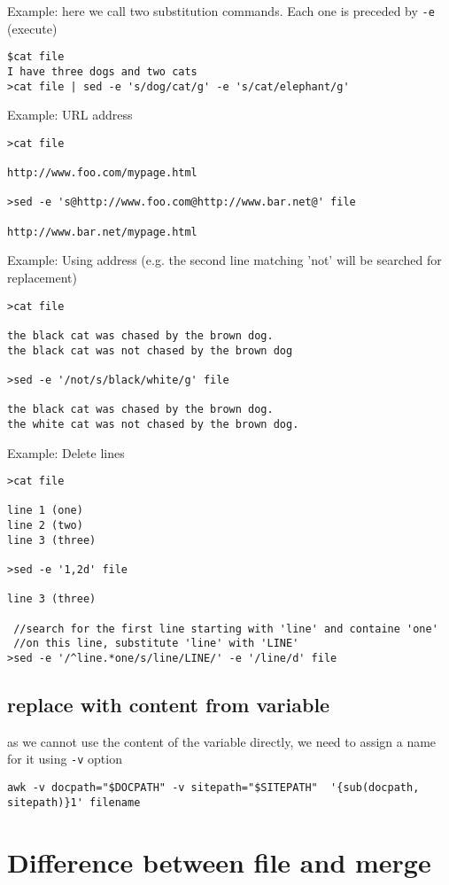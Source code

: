 Example: here we call two substitution commands. Each one is preceded by
\verb!-e! (execute)
\begin{verbatim}
$cat file
I have three dogs and two cats
>cat file | sed -e 's/dog/cat/g' -e 's/cat/elephant/g' 
\end{verbatim}

Example: URL address
\begin{verbatim}
>cat file

http://www.foo.com/mypage.html

>sed -e 's@http://www.foo.com@http://www.bar.net@' file

http://www.bar.net/mypage.html
\end{verbatim}

Example: Using address (e.g. the second line matching 'not' will be searched for
replacement)
\begin{verbatim}
>cat file

the black cat was chased by the brown dog.
the black cat was not chased by the brown dog

>sed -e '/not/s/black/white/g' file

the black cat was chased by the brown dog.
the white cat was not chased by the brown dog. 
\end{verbatim}

Example: Delete lines
\begin{verbatim}
>cat file

line 1 (one)
line 2 (two)
line 3 (three)

>sed -e '1,2d' file

line 3 (three)

 //search for the first line starting with 'line' and containe 'one'
 //on this line, substitute 'line' with 'LINE'
>sed -e '/^line.*one/s/line/LINE/' -e '/line/d' file
\end{verbatim}


\subsection{replace with content from variable}


as we cannot use the content of the variable directly, we need to assign a name
for it using \verb!-v! option
\begin{verbatim}
awk -v docpath="$DOCPATH" -v sitepath="$SITEPATH"  '{sub(docpath, sitepath)}1' filename
\end{verbatim}


\section{Difference between file and merge}


